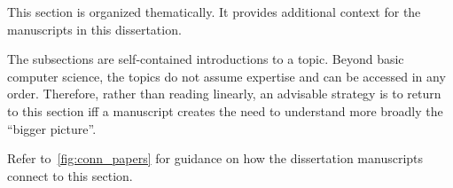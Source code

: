 
This section is organized thematically.
It provides additional context for the manuscripts in this dissertation.

The subsections are self-contained introductions to a topic.
Beyond basic computer science, the topics do not assume expertise and can be accessed in any order.
Therefore, rather than reading linearly, an advisable strategy is to return to this section iff a manuscript creates the need to understand more broadly the \enquote{bigger picture}.

Refer to~\autoref{fig:conn_papers} for guidance on how the dissertation manuscripts connect to this section.

